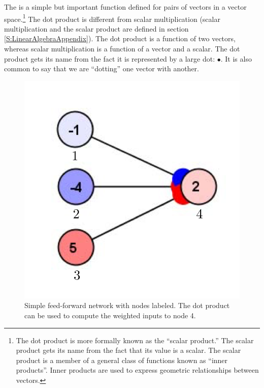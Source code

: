 
 The  is a simple but important function defined 
for pairs of vectors in a vector space.\footnote{The dot product is more 
formally known as the ``scalar product.'' The scalar product gets its name from 
the fact that its value is a scalar. The scalar product is a member 
of a general class of functions known as ``inner products''. Inner products 
are used to express geometric relationships between vectors.}  The dot 
product is different from scalar multiplication (scalar multiplication and the scalar product are defined in section \ref{S:LinearAlgebraAppendix}). The dot product is a
function of two vectors, whereas scalar multiplication is a function of a vector
and a scalar. The dot product gets its name from the fact it is represented by 
a large dot: $\bullet$. It is also common to say that we are ``dotting'' one 
vector with another.
\begin{figure}[h]
\centering
\includegraphics[scale=.7]{./images/Simple3Labelled.png}
\caption[Simbrain screenshot.]{Simple feed-forward network with nodes labeled. The dot product can be used to compute the weighted inputs to node 4.}
\label{F:simplelabelled}
\end{figure}

